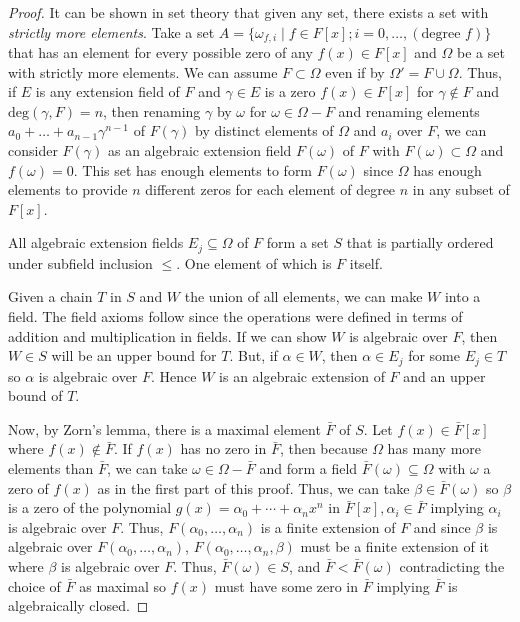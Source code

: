 \begin{proof}
    It can be shown in set theory that given any set, there exists a set with \emph{strictly more elements}. Take a set $A = \{\omega_{f,i}\mid f\in F[x];i = 0, \ldots, (\text{degree } f)\}$ that has an element for every possible zero of any $f(x) \in F[x]$ and $\Omega$ be a set with strictly more elements. We can assume $F \subset \Omega$ even if by $\Omega' = F \cup \Omega$. Thus, if $E$ is any extension field of $F$ and $\gamma \in E$ is a zero $f(x) \in F[x]$ for $\gamma \notin F$ and $\text{deg}(\gamma, F) = n$, then renaming $\gamma$ by $\omega$ for $\omega \in \Omega - F$ and renaming elements $a_0 + \ldots + a_{n-1}\gamma^{n-1}$ of $F(\gamma)$ by distinct elements of $\Omega$ and $a_i$ over $F$, we can consider $F(\gamma)$ as an algebraic extension field $F(\omega)$ of $F$ with $F(\omega) \subset \Omega$ and $f(\omega) = 0$. This set has enough elements to form $F(\omega)$ since $\Omega$ has enough elements to provide $n$ different zeros for each element of degree $n$ in any subset of $F[x]$.

    All algebraic extension fields $E_j \subseteq \Omega$ of $F$ form a set $S$ that is partially ordered under subfield inclusion $\leq$. One element of which is $F$ itself.

    Given a chain $T$ in $S$ and $W$ the union of all elements, we can make $W$ into a field. The field axioms follow since the operations were defined in terms of addition and multiplication in fields. If we can show $W$ is algebraic over $F$, then $W \in S$ will be an upper bound for $T$. But, if $\alpha \in W$, then $\alpha \in E_j$ for some $E_j \in T$ so $\alpha$ is algebraic over $F$. Hence $W$ is an algebraic extension of $F$ and an upper bound of $T$. 

    Now, by Zorn's lemma, there is a maximal element $\bar{F}$ of $S$. Let $f(x) \in \bar{F}[x]$ where $f(x) \notin\bar{F}$. If $f(x)$ has no zero in $\bar{F}$, then because $\Omega$ has many more elements than $\bar{F}$, we can take $\omega \in \Omega - \bar{F}$ and form a field $\bar{F}(\omega) \subseteq \Omega$ with $\omega$ a zero of $f(x)$ as in the first part of this proof. Thus, we can take $\beta \in \bar{F}(\omega)$ so $\beta$ is a zero of the polynomial $g(x) = \alpha_0 + \cdots + \alpha_nx^n$ in $\bar{F}[x], \alpha_i \in \bar{F}$ implying $\alpha_i$ is algebraic over $F$. Thus, $F(\alpha_0, \ldots, \alpha_n)$ is a finite extension of $F$ and since $\beta$ is algebraic over $F(\alpha_0, \ldots, \alpha_n)$, $F(\alpha_0, \ldots, \alpha_n, \beta)$ must be a finite extension of it where $\beta$ is algebraic over $F$. Thus, $\bar{F}(\omega) \in S$, and $\bar{F} < \bar{F}(\omega)$ contradicting the choice of $\bar{F}$ as maximal so $f(x)$ must have some zero in $\bar{F}$ implying $\bar{F}$ is algebraically closed.
\end{proof}